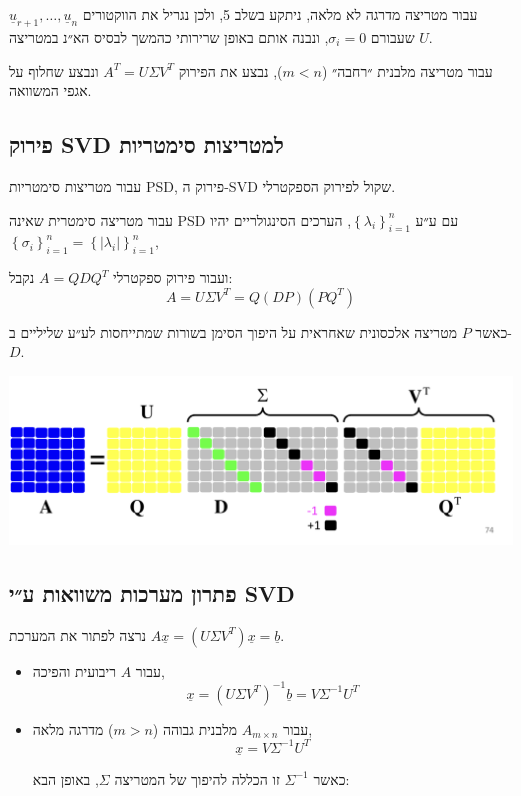 \documentclass[11pt]{article}
\begin{document}
עבור מטריצה מדרגה לא מלאה, ניתקע בשלב 5, ולכן נגריל את הווקטורים \(\underline{u}_{r+1}, \ldots, \underline{u}_n\) שעבורם \(\sigma_i = 0\),
ונבנה אותם באופן שרירותי כהמשך לבסיס הא״נ במטריצה \(U\).

עבור מטריצה מלבנית ״רחבה״ (\(m < n\)), נבצע את הפירוק \(A^T = U\Sigma V^T\) ונבצע שחלוף על אגפי המשוואה.

\subsection{פירוק SVD למטריצות סימטריות}
\label{sec:org2d9f120}
עבור מטריצות סימטריות PSD, פירוק ה-SVD שקול לפירוק הספקטרלי.

עבור מטריצה סימטרית שאינה PSD עם ע״ע \(\left\{  \lambda_i \right\}_{i=1}^n\), הערכים הסינגולריים יהיו \(\left\{  \sigma_i\right\}_{i=1}^n = \left\{  \left| \lambda_i \right|  \right\}_{i=1}^n\),

ועבור פירוק ספקטרלי \(A = QDQ^T\) נקבל:
\[
A = U\Sigma V^T = Q \left( D P \right) \left( P Q^{T} \right)
\]

כאשר \(P\) מטריצה אלכסונית שאחראית על היפוך הסימן בשורות שמתייחסות לע״ע שליליים ב-\(D\).

\begin{center}
\includegraphics[width=.9\linewidth]{./img/specral-decomposition-non-psd.png}
\end{center}

\subsection{פתרון מערכות משוואות ע״י SVD}
\label{sec:org6d283d9}
נרצה לפתור את המערכת \(A\underline{x}= \left( U \Sigma V^T \right)\underline{x} = \underline{b}\).

\begin{itemize}
\item עבור \(A\) ריבועית והפיכה,
\[
  \underline{x} = \left( U \Sigma V^T \right)^{-1}\underline{b}
  =
  V \Sigma^{-1} U^T
  \]

\item עבור \(A_{m \times n}\) מלבנית גבוהה (\(m>n\)) מדרגה מלאה,
\[
  \underline{x} = V \Sigma^{-1} U^T
  \]

כאשר \(\Sigma^{-1}\) זו הכללה להיפוך של המטריצה \(\Sigma\), באופן הבא:
\end{itemize}
\end{document}

